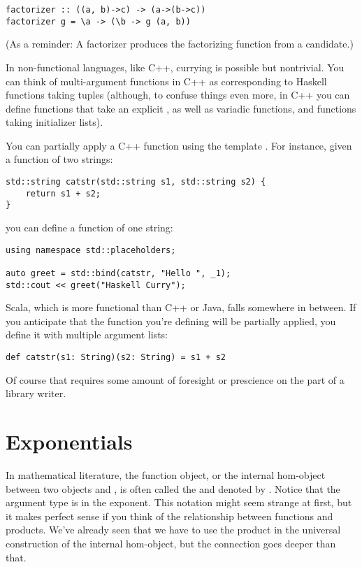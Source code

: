 \begin{Verbatim}
factorizer :: ((a, b)->c) -> (a->(b->c))
factorizer g = \a -> (\b -> g (a, b))
\end{Verbatim}
(As a reminder: A factorizer produces the factorizing function from a
candidate.)

In non-functional languages, like C++, currying is possible but
nontrivial. You can think of multi-argument functions in C++ as
corresponding to Haskell functions taking tuples (although, to confuse
things even more, in C++ you can define functions that take an explicit
, as well as variadic functions, and functions taking
initializer lists).

You can partially apply a C++ function using the template
. For instance, given a function of two strings:

\begin{Verbatim}
std::string catstr(std::string s1, std::string s2) {
    return s1 + s2;
}
\end{Verbatim}
you can define a function of one string:

\begin{Verbatim}
using namespace std::placeholders;

auto greet = std::bind(catstr, "Hello ", _1);
std::cout << greet("Haskell Curry");
\end{Verbatim}
Scala, which is more functional than C++ or Java, falls somewhere in
between. If you anticipate that the function you're defining will be
partially applied, you define it with multiple argument lists:

\begin{Verbatim}
def catstr(s1: String)(s2: String) = s1 + s2
\end{Verbatim}
Of course that requires some amount of foresight or prescience on the
part of a library writer.

\section{Exponentials}\label{exponentials}

In mathematical literature, the function object, or the internal
hom-object between two objects  and , is often
called the  and denoted by . Notice that
the argument type is in the exponent. This notation might seem strange
at first, but it makes perfect sense if you think of the relationship
between functions and products. We've already seen that we have to use
the product in the universal construction of the internal hom-object,
but the connection goes deeper than that.

